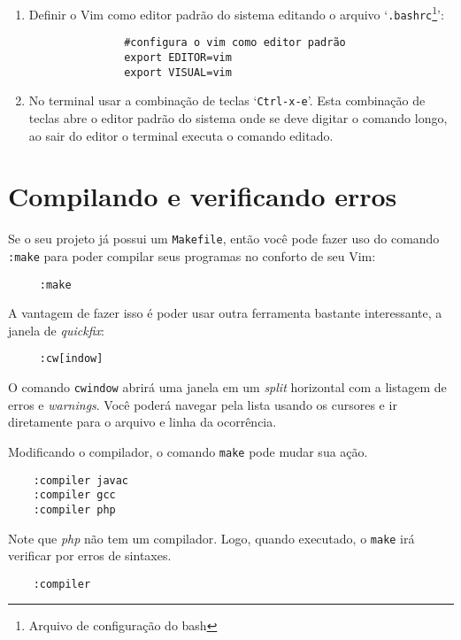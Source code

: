 \begin{enumerate}
     \item Definir o Vim como editor padrão do sistema editando 
           o arquivo `{\tt .bashrc}\footnote{Arquivo de configuração do bash}':
           \begin{verbatim}
               #configura o vim como editor padrão
               export EDITOR=vim
               export VISUAL=vim
            \end{verbatim}
      \item No terminal usar a combinação de teclas `{\tt Ctrl-x-e}'.
            Esta combinação de teclas abre o editor padrão do sistema
            onde se deve digitar o comando longo, ao sair do editor 
            o terminal executa o comando editado.
\end{enumerate}

\section{Compilando e verificando erros}

Se o seu projeto já possui um {\tt Makefile}, então você pode fazer uso do comando
{\tt :make} para poder compilar seus programas no conforto de seu Vim:

\begin{verbatim}
     :make
\end{verbatim}

A vantagem de fazer isso é poder usar outra ferramenta bastante interessante, a janela
de {\em quickfix}:

\begin{verbatim}
     :cw[indow]
\end{verbatim}

O comando {\tt cwindow} abrirá uma janela em um {\em split} horizontal com a
listagem de erros e {\em warnings}.  Você poderá navegar pela lista usando os
cursores e ir diretamente para o arquivo e linha da ocorrência.

Modificando o compilador, o comando {\tt make} pode mudar sua ação.

\begin{verbatim}
	:compiler javac
	:compiler gcc
	:compiler php
\end{verbatim}

Note que {\em php} não tem um compilador. Logo, quando executado, o {\tt make} irá verificar
por erros de sintaxes.

\begin{verbatim}
	:compiler
\end{verbatim}

